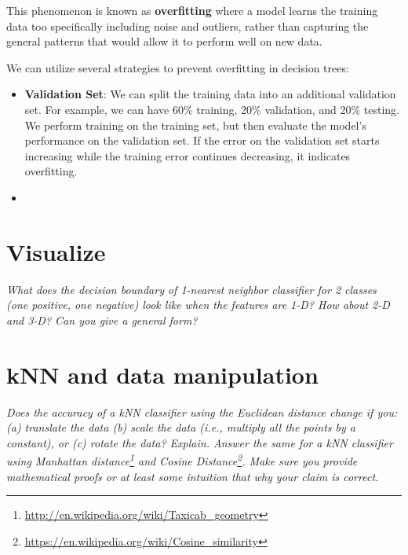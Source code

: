 \documentclass[fleqn]{article}
\begin{document}
This phenomenon is known as \textbf{overfitting} where a model learns the training data too specifically including noise and outliers,
rather than capturing the general patterns that would allow it to perform well on new data.

We can utilize several strategies to prevent overfitting in decision trees:
\begin{itemize}
	\item \textbf{Validation Set}: We can split the training data into an additional validation set. For example, we can have 60\% training, 20\% validation, and 20\% testing.
	      We perform training on the training set, but then evaluate the model's performance on the validation set.
	      If the error on the validation set starts increasing while the training error continues decreasing, it indicates overfitting.
	\item \textbf{}
\end{itemize}




\section{Visualize}
\textit{What does the decision boundary of 1-nearest neighbor classifier for 2 classes (one positive, one negative) look like when the features are 1-D? How about 2-D and 3-D? Can you give a general form?}

\section{kNN and data manipulation}
\textit{Does the accuracy of a kNN classifier using the Euclidean distance change if you:(a) translate the data (b) scale the data (i.e., multiply all the points by a constant), or (c) rotate the data? Explain. Answer the same for a kNN classifier using Manhattan distance\footnote{\url{http://en.wikipedia.org/wiki/Taxicab_geometry}} and Cosine Distance\footnote{\url{https://en.wikipedia.org/wiki/Cosine_similarity}}. Make sure you provide mathematical proofs or at least some intuition that why your claim is correct.}
\end{document}
